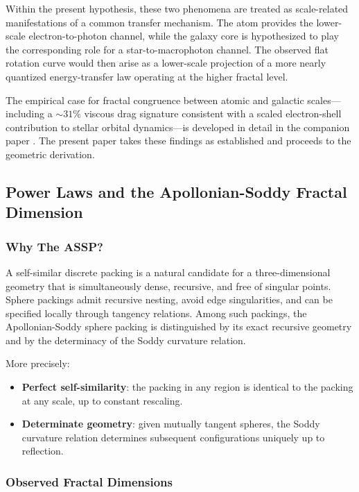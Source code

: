\documentclass[11pt,a4paper]{article}
\begin{document}
Within the present hypothesis, these two phenomena are treated as scale-related manifestations of a common transfer mechanism. The atom provides the lower-scale electron-to-photon channel, while the galaxy core is hypothesized to play the corresponding role for a star-to-macrophoton channel. The observed flat rotation curve would then arise as a lower-scale projection of a more nearly quantized energy-transfer law operating at the higher fractal level.

The empirical case for fractal congruence between atomic and galactic scales---including a $\sim31\%$ viscous drag signature consistent with a scaled electron-shell contribution to stellar orbital dynamics---is developed in detail in the companion paper \cite{FSEquivalence2026}. The present paper takes these findings as established and proceeds to the geometric derivation.

\subsection{Power Laws and the Apollonian-Soddy Fractal Dimension}

\subsubsection{Why The ASSP?}

A self-similar discrete packing is a natural candidate for a three-dimensional geometry that is simultaneously dense, recursive, and free of singular points. Sphere packings admit recursive nesting, avoid edge singularities, and can be specified locally through tangency relations. Among such packings, the Apollonian-Soddy sphere packing is distinguished by its exact recursive geometry and by the determinacy of the Soddy curvature relation.

More precisely:
\begin{itemize}
  \item \textbf{Perfect self-similarity}: the packing in any region is identical to the packing at any scale, up to constant rescaling.
  \item \textbf{Determinate geometry}: given mutually tangent spheres, the Soddy curvature relation determines subsequent configurations uniquely up to reflection.
\end{itemize}

\subsubsection{Observed Fractal Dimensions}
\end{document}
